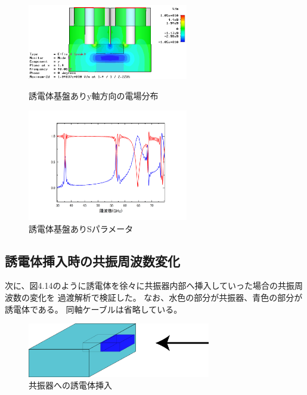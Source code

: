 \begin{figure}[h]
 \begin{minipage}{0.5\hsize}
  \begin{center}
   \includegraphics[width=70mm]{./image/model73_y_x.png}
  \end{center}
  \caption{誘電体基盤ありy軸方向の電場分布}
  \label{fig:one}
 \end{minipage}
 \begin{minipage}{0.5\hsize}
  \begin{center}
   \includegraphics[width=70mm]{./image/Graph4.jpg}
  \end{center}
  \caption{誘電体基盤ありSパラメータ}
  \label{fig:two}
 \end{minipage}
\end{figure}

\subsection{誘電体挿入時の共振周波数変化}
次に、図4.14のように誘電体を徐々に共振器内部へ挿入していった場合の共振周波数の変化を
過渡解析で検証した。
なお、水色の部分が共振器、青色の部分が誘電体である。
同軸ケーブルは省略している。
\vspace{10 mm}

\begin{figure}[h]
  \begin{center}
    \includegraphics[width=8cm]{./image/insert.png}
    \caption{共振器への誘電体挿入}
    \label{fig:insert}
  \end{center}
\end{figure}

